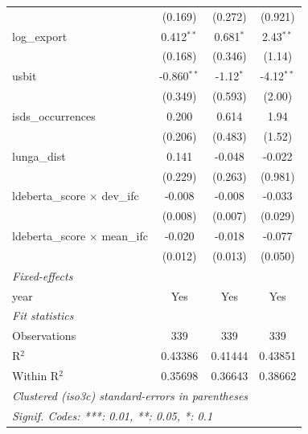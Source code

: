 \begin{tabular}{lccc}
                                         & (0.169)                                     & (0.272)                   & (0.921)\\   
   log\_export                           & 0.412$^{**}$                                & 0.681$^{*}$               & 2.43$^{**}$\\   
                                         & (0.168)                                     & (0.346)                   & (1.14)\\   
   usbit                                 & -0.860$^{**}$                               & -1.12$^{*}$               & -4.12$^{**}$\\   
                                         & (0.349)                                     & (0.593)                   & (2.00)\\   
   isds\_occurrences                     & 0.200                                       & 0.614                     & 1.94\\   
                                         & (0.206)                                     & (0.483)                   & (1.52)\\   
   lunga\_dist                           & 0.141                                       & -0.048                    & -0.022\\   
                                         & (0.229)                                     & (0.263)                   & (0.981)\\   
   ldeberta\_score $\times$ dev\_ifc     & -0.008                                      & -0.008                    & -0.033\\   
                                         & (0.008)                                     & (0.007)                   & (0.029)\\   
   ldeberta\_score $\times$ mean\_ifc    & -0.020                                      & -0.018                    & -0.077\\   
                                         & (0.012)                                     & (0.013)                   & (0.050)\\   
   \midrule
   \emph{Fixed-effects}\\
   year                                  & Yes                                         & Yes                       & Yes\\  
   \midrule
   \emph{Fit statistics}\\
   Observations                          & 339                                         & 339                       & 339\\  
   R$^2$                                 & 0.43386                                     & 0.41444                   & 0.43851\\  
   Within R$^2$                          & 0.35698                                     & 0.36643                   & 0.38662\\  
   \midrule \midrule
   \multicolumn{4}{l}{\emph{Clustered (iso3c) standard-errors in parentheses}}\\
   \multicolumn{4}{l}{\emph{Signif. Codes: ***: 0.01, **: 0.05, *: 0.1}}\\
\end{tabular}
\par\endgroup


